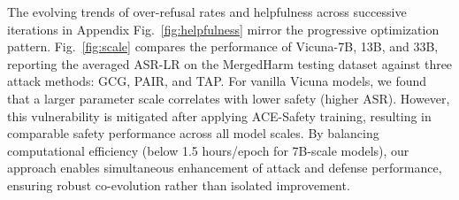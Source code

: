\documentclass[11pt]{article}
\def\framework{ACE-Safety}
\def\attackmethod{GS-MCTS}
\begin{document}
The evolving trends of over-refusal rates and helpfulness across successive iterations in Appendix Fig.~\ref{fig:helpfulness} mirror the progressive optimization pattern. Fig.~\ref{fig:scale} compares the performance of Vicuna-7B, 13B, and 33B, reporting the averaged ASR-LR on the MergedHarm testing dataset against three attack methods: GCG, PAIR, and TAP. For vanilla Vicuna models, we found that a larger parameter scale correlates with lower safety (higher ASR). However, this vulnerability is mitigated after applying {\framework} training, resulting in comparable safety performance across all model scales. By balancing computational efficiency (below 1.5 hours/epoch for 7B-scale models), our approach enables simultaneous enhancement of attack and defense performance, ensuring robust co-evolution rather than isolated improvement.







\end{document}
